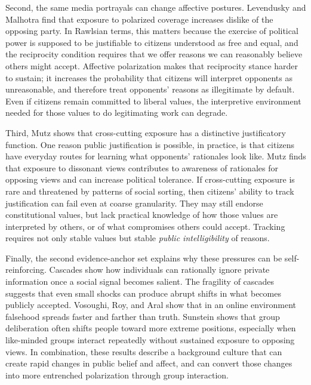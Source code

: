 \documentclass[12pt]{report}
\begin{document}
Second, the same media portrayals can change affective postures. Levendusky and Malhotra find that exposure to polarized coverage increases dislike of the opposing party.\parencite[p.~292]{levenduskyMalhotra2016polarization} In Rawlsian terms, this matters because the exercise of political power is supposed to be justifiable to citizens understood as free and equal, and the reciprocity condition requires that we offer reasons we can reasonably believe others might accept.\parencite[p.~771]{rawls1997public} Affective polarization makes that reciprocity stance harder to sustain; it increases the probability that citizens will interpret opponents as unreasonable, and therefore treat opponents’ reasons as illegitimate by default. Even if citizens remain committed to liberal values, the interpretive environment needed for those values to do legitimating work can degrade.

Third, Mutz shows that cross-cutting exposure has a distinctive justificatory function. One reason public justification is possible, in practice, is that citizens have everyday routes for learning what opponents’ rationales look like. Mutz finds that exposure to dissonant views contributes to awareness of rationales for opposing views and can increase political tolerance.\parencite[p.~118]{mutz2002crosscutting} If cross-cutting exposure is rare\parencite[p.~111]{mutz2002crosscutting} and threatened by patterns of social sorting,\parencite[p.~122]{mutz2002crosscutting} then citizens’ ability to track justification can fail even at coarse granularity. They may still endorse constitutional values, but lack practical knowledge of how those values are interpreted by others, or of what compromises others could accept. Tracking requires not only stable values but stable \emph{public intelligibility} of reasons.

Finally, the second evidence-anchor set explains why these pressures can be self-reinforcing. Cascades show how individuals can rationally ignore private information once a social signal becomes salient.\parencite[p.~992]{bikhchandaniHirshleiferWelch1992cascades} The fragility of cascades suggests that even small shocks can produce abrupt shifts in what becomes publicly accepted.\parencite[p.~996]{bikhchandaniHirshleiferWelch1992cascades} Vosoughi, Roy, and Aral show that in an online environment falsehood spreads faster and farther than truth.\parencite[p.~1146]{vosoughiRoyAral2018falseNews} Sunstein shows that group deliberation often shifts people toward more extreme positions, especially when like-minded groups interact repeatedly without sustained exposure to opposing views.\parencite[p.~176]{sunstein2002groupPolarization} In combination, these results describe a background culture that can create rapid changes in public belief and affect, and can convert those changes into more entrenched polarization through group interaction.
\end{document}
